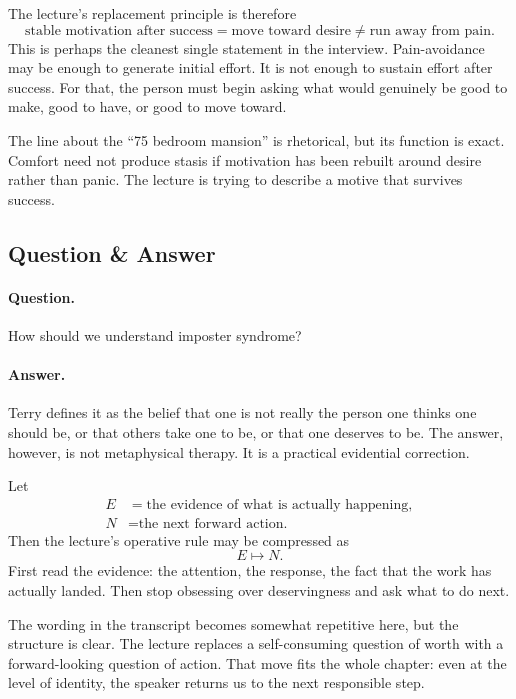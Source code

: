 The lecture's replacement principle is therefore
\begin{equation}
\text{stable motivation after success}
=
\text{move toward desire}
\neq
\text{run away from pain}.
\end{equation}
This is perhaps the cleanest single statement in the interview. Pain-avoidance may be enough to generate initial effort. It is not enough to sustain effort after success. For that, the person must begin asking what would genuinely be good to make, good to have, or good to move toward.

The line about the ``75 bedroom mansion'' is rhetorical, but its function is exact. Comfort need not produce stasis if motivation has been rebuilt around desire rather than panic. The lecture is trying to describe a motive that survives success.

\subsection{Question \& Answer}

\paragraph{Question.} How should we understand imposter syndrome?

\paragraph{Answer.} Terry defines it as the belief that one is not really the person one thinks one should be, or that others take one to be, or that one deserves to be. The answer, however, is not metaphysical therapy. It is a practical evidential correction.

Let
\begin{align}
E &= \text{the evidence of what is actually happening},\\
N &= \text{the next forward action.}
\end{align}
Then the lecture's operative rule may be compressed as
\begin{equation}
E \longmapsto N.
\end{equation}
First read the evidence: the attention, the response, the fact that the work has actually landed. Then stop obsessing over deservingness and ask what to do next.

The wording in the transcript becomes somewhat repetitive here, but the structure is clear. The lecture replaces a self-consuming question of worth with a forward-looking question of action. That move fits the whole chapter: even at the level of identity, the speaker returns us to the next responsible step.

